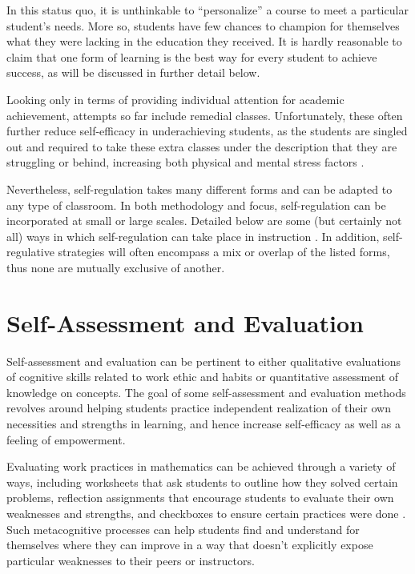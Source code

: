 In this status quo, it is unthinkable to ``personalize'' a course to meet a particular student's needs. More so, students have few chances to champion for themselves what they were lacking in the education they received. It is hardly reasonable to claim that one form of learning is the best way for every student to achieve success, as will be discussed in further detail below.

Looking only in terms of providing individual attention for academic achievement, attempts so far include remedial classes. Unfortunately, these often further reduce self-efficacy in underachieving students, as the students are singled out and required to take these extra classes under the description that they are struggling or behind, increasing both physical and mental stress factors \citep{martin_developmental_2017}.

Nevertheless, self-regulation takes many different forms and can be adapted to any type of classroom. In both methodology and focus, self-regulation can be incorporated at small or large scales. Detailed below are some (but certainly not all) ways in which self-regulation can take place in instruction \citep{montague_self-regulation_2007}. In addition, self-regulative strategies will often encompass a mix or overlap of the listed forms, thus none are mutually exclusive of another.

\section{Self-Assessment and Evaluation}
Self-assessment and evaluation can be pertinent to either qualitative evaluations of cognitive skills related to work ethic and habits or quantitative assessment of knowledge on concepts.
The goal of some self-assessment and evaluation methods revolves around helping students practice independent realization of their own necessities and strengths in learning, and hence increase self-efficacy as well as a feeling of empowerment.

Evaluating work practices in mathematics can be achieved through a variety of ways, including worksheets that ask students to outline how they solved certain problems, reflection assignments that encourage students to evaluate their own weaknesses and strengths, and checkboxes to ensure certain practices were done \citep{montague_self-regulation_2007}. Such metacognitive processes can help students find and understand for themselves where they can improve in a way that doesn't explicitly expose particular weaknesses to their peers or instructors.

